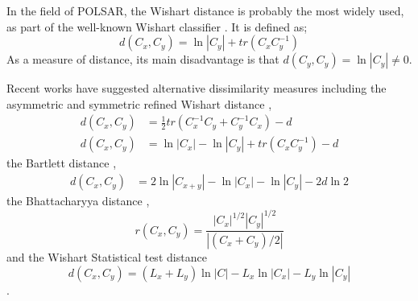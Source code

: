 \documentclass[journal]{IEEEtran}
\begin{document}
In the field of POLSAR, the Wishart distance is probably the most widely used, as part of the well-known Wishart classifier \cite{Lee_1999_TGRS}.
It is defined \cite{Lee_1994_IJRS_2299} as;
\begin{equation}
  d(C_x,C_y) = \ln|C_y| + tr(C_xC_y^{-1})
\end{equation}
As a measure of distance, its main disadvantage is that $d(C_y,C_y) = \ln|C_y| \neq 0$.

Recent works have suggested alternative dissimilarity measures including the asymmetric and symmetric refined Wishart distance \cite{Anfinsen_2007_ESA_POLINSAR},
\begin{align}
  d(C_x,C_y) &= \frac{1}{2} tr(C_x^{-1}C_y + C_y^{-1}C_x) - d \\
    d(C_x,C_y) &= \ln|C_x| - \ln|C_y| + tr(C_xC_y^{-1}) - d
\end{align}
the Bartlett distance \cite{Kersten_2005_TGRS_519},
  \begin{align}
  d(C_x,C_y) &= 2 \ln |C_{x+y}| - \ln |C_x| - \ln |C_y| - 2d\ln2
  \end{align}
the Bhattacharyya distance \cite{Lee_2011_IGARSS_3740},
\begin{equation}
  r(C_x,C_y) = \frac{|C_x|^{1/2} |C_y|^{1/2}}{|(C_x+C_y)/2|}
\end{equation}
and the Wishart Statistical test distance \cite{Cao_2007_TGRS_3454}
\begin{equation}
  d(C_x,C_y) = (L_x + L_y) \ln|C| - L_x \ln|C_x| - L_y\ln|C_y|
\end{equation}
.



\end{document}
